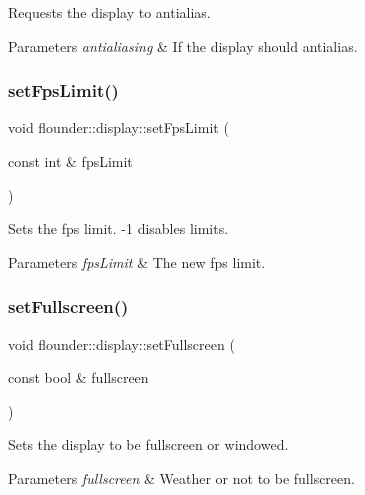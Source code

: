 Requests the display to antialias. 


\begin{DoxyParams}{Parameters}
{\em antialiasing} & If the display should antialias. \\
\hline
\end{DoxyParams}
\mbox{\label{classflounder_1_1display_a7d24403c951e5a043675c3e7b02c3c34}} 
\subsubsection{\texorpdfstring{set\+Fps\+Limit()}{setFpsLimit()}}
{\footnotesize\ttfamily void flounder\+::display\+::set\+Fps\+Limit (\begin{DoxyParamCaption}\item[{const int \&}]{fps\+Limit }\end{DoxyParamCaption})}



Sets the fps limit. -\/1 disables limits. 


\begin{DoxyParams}{Parameters}
{\em fps\+Limit} & The new fps limit. \\
\hline
\end{DoxyParams}
\mbox{\label{classflounder_1_1display_ae5ee27f982e6a947305dc6e71a23021b}} 
\subsubsection{\texorpdfstring{set\+Fullscreen()}{setFullscreen()}}
{\footnotesize\ttfamily void flounder\+::display\+::set\+Fullscreen (\begin{DoxyParamCaption}\item[{const bool \&}]{fullscreen }\end{DoxyParamCaption})}



Sets the display to be fullscreen or windowed. 


\begin{DoxyParams}{Parameters}
{\em fullscreen} & Weather or not to be fullscreen. \\
\hline
\end{DoxyParams}
\mbox{\label{classflounder_1_1display_ae1bf2028faaf411fedc80ca511a2e739}} 
